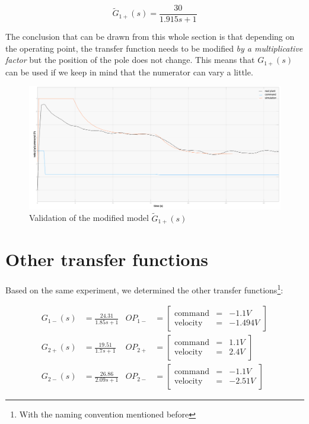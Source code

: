 \begin{equation}
    \tilde{G}_{1+}(s) = \frac{30}{1.915 s + 1}
\end{equation}

The conclusion that can be drawn from this whole section is that depending on the operating point, the transfer function
needs to be modified \textit{by a multiplicative factor} but the position of the pole does not change. This means that 
$G_{1+}(s)$ can be used if we keep in mind that the numerator can vary a little.

\begin{figure}[H]
    \centering
    \includegraphics[height=\textheight/3]{Pictures/validation_A0_30.png}
    \caption{Validation of the modified model $\tilde{G}_{1+}(s)$}
    \label{fig:validation_A0_30}
\end{figure}

\section{Other transfer functions}

Based on the same experiment, we determined the other transfer functions\footnote{With the naming convention mentioned 
before}:

\begin{align}
    G_{1-}(s) &= \frac{24.31}{1.85 s + 1} & OP_{1-} &= \begin{bmatrix}
                \text{command} & = & -1.1 V \\
                \text{velocity} & = & -1.494 V
                \end{bmatrix} 
    \label{TF_mot1_-} \\
    G_{2+}(s) &= \frac{19.51}{1.7 s + 1} & OP_{2+} &= \begin{bmatrix}
                \text{command} & = & 1.1 V \\
                \text{velocity} & = & 2.4 V
                \end{bmatrix} 
    \label{TF_mot2_+} \\
    G_{2-}(s) &= \frac{26.86}{2.09 s + 1} & OP_{2-} &= \begin{bmatrix}
                \text{command} & = & -1.1 V \\
                \text{velocity} & = & -2.51 V
                \end{bmatrix} 
    \label{TF_mot2_-}
\end{align}


